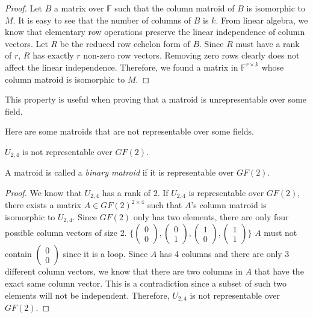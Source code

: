 \begin{proof}
Let $B$ a matrix over $\mathbb{F}$ such that the column matroid of $B$ is isomorphic to $M$.
It is easy to see that the number of columns of $B$ is $k$.
From linear algebra, we know that elementary row operations preserve the linear independence of column vectors.
Let $R$ be the reduced row echelon form of $B$.
Since $R$ must have a rank of $r$, $R$ has exactly $r$ non-zero row vectors.
Removing zero rows clearly does not affect the linear independence.
Therefore, we found a matrix in $\mathbb{F}^{r \times k}$ whose column matroid is isomorphic to $M$.
\end{proof}

This property is useful when proving that a matroid is unrepresentable over some field.

Here are some matroids that are not representable over some fields.

\begin{thm}
$U_{2, 4}$ is not representable over $GF(2)$.
\end{thm}

A matroid is called a \textit{binary matroid} if it is representable over $GF(2)$.

\begin{proof}
We know that $U_{2, 4}$ has a rank of $2$.
If $U_{2, 4}$ is representable over $GF(2)$, there exists a matrix $A \in GF(2)^{2 \times 4}$ such that $A$'s column matroid is isomorphic to $U_{2, 4}$.
Since $GF(2)$ only has two elements, there are only four possible column vectors of size 2.
$\bigg\{\begin{pmatrix}0\\0\end{pmatrix},
\begin{pmatrix}0\\1\end{pmatrix},
\begin{pmatrix}1\\0\end{pmatrix},
\begin{pmatrix}1\\1\end{pmatrix}\bigg\}$
$A$ must not contain $\begin{pmatrix}0\\0\end{pmatrix}$ since it is a loop. 
Since $A$ has 4 columns and there are only 3 different column vectors, we know that there are two columns in $A$ that have the exact same column vector.
This is a contradiction since a subset of such two elements will not be independent.
Therefore, $U_{2, 4}$ is not representable over $GF(2)$.
\end{proof}

